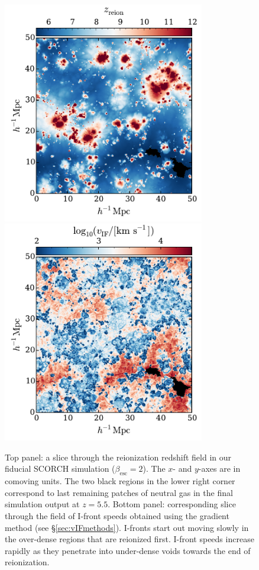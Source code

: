 \documentclass[twocolumn]{aastex62}
\begin{document}
\begin{figure}
\includegraphics[width=8.8cm]{fig6a.pdf}
\includegraphics[width=8.8cm]{fig6b.pdf}
\caption{Top panel: a slice through the reionization redshift field in our fiducial SCORCH simulation ($\beta_{\mathrm{esc}} = 2$). The $x$- and $y$-axes are in comoving units.  The two black regions in the lower right corner correspond to last remaining patches of neutral gas in the final simulation output at $z=5.5$. Bottom panel: corresponding slice through the field of I-front speeds obtained using the gradient method  (see \S \ref{sec:vIFmethods}).  I-fronts start out moving slowly in the over-dense regions that are reionized first.  I-front speeds increase rapidly as they penetrate into under-dense voids towards the end of reionization.    }
\label{fig:gradientvis}
\end{figure}
\end{document}
